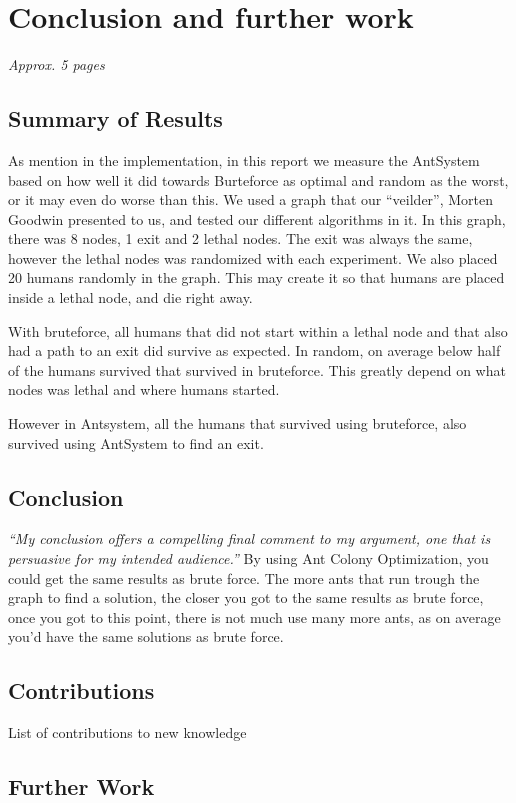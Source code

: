 \chapter{Conclusion and further work}
\label{ch:conclusion}
\textit{Approx. 5 pages}

\section{Summary of Results}

As mention in the implementation, in this report we measure the AntSystem based on how well it did towards Burteforce as optimal and random as the worst, or it may even do worse than this. We used a graph that our “veilder”, Morten Goodwin presented to us, and tested our different algorithms in it. In this graph, there was 8 nodes, 1 exit and 2 lethal nodes. The exit was always the same, however the lethal nodes was randomized with each experiment. We also placed 20 humans randomly in the graph. This may create it so that humans are placed inside a lethal node, and die right away.

With bruteforce, all humans that did not start within a lethal node and that also had a path to an exit did survive as expected. In random, on average below half of the humans survived that survived in bruteforce. This greatly depend on what nodes was lethal and where humans started.

However in Antsystem, all the humans that survived using bruteforce, also survived using AntSystem to find an exit.

\section{Conclusion}
\emph{``My conclusion offers a compelling final comment to my argument, one that is persuasive for my
intended audience.''}
By using Ant Colony Optimization, you could get the same results as brute force. The more ants that run trough the graph to find a solution, the closer you got to the same results as brute force, once you got to this point, there is not much use many more ants, as on average you'd have the same solutions as brute force.


\section{Contributions}
List of contributions to new knowledge

\section{Further Work}